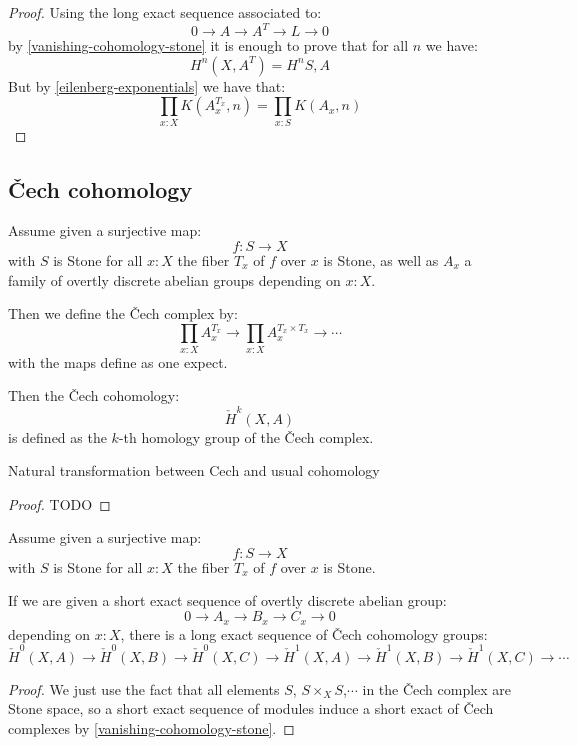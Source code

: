 \begin{proof}
Using the long exact sequence associated to:
\[0\to A\to A^T\to L\to 0\]
by \cref{vanishing-cohomology-stone} it is enough to prove that for all $n$ we have:
\[H^n(X,A^T) = H^n{S,A}\]
But by \cref{eilenberg-exponentials} we have that:
\[\prod_{x:X}K(A_x^{T_x},n) = \prod_{x:S}K(A_x,n)\]
\end{proof}


\subsection{\v{C}ech cohomology}

\begin{definition}
Assume given a surjective map:
\[f:S\to X\]
with $S$ is Stone for all $x:X$ the fiber $T_x$ of $f$ over $x$ is Stone, as well as $A_x$ a family of overtly discrete abelian groups depending on $x:X$.

Then we define the \v{C}ech complex by:
\[\prod_{x:X}A_x^{T_x} \to \prod_{x:X}A_x^{T_x\times T_x} \to \cdots\]
with the maps define as one expect.

Then the \v{C}ech cohomology:
\[\check{H}^k(X,A)\]
is defined as the $k$-th homology group of the \v{C}ech complex.
\end{definition}

\begin{lemma}
Natural transformation between Cech and usual cohomology
\end{lemma}

\begin{proof}
TODO
\end{proof}

\begin{lemma}
Assume given a surjective map:
\[f:S\to X\]
with $S$ is Stone for all $x:X$ the fiber $T_x$ of $f$ over $x$ is Stone.

If we are given a short exact sequence of overtly discrete abelian group:
\[0\to A_x\to B_x\to C_x\to 0\]
depending on $x:X$, there is a long exact sequence of \v{C}ech cohomology groups:
\[\check{H}^0(X,A) \to\check{H}^0(X,B) \to\check{H}^0(X,C) \to\check{H}^1(X,A) \to\check{H}^1(X,B) \to\check{H}^1(X,C) \to\cdots \]
\end{lemma}

\begin{proof}
We just use the fact that all elements $S$, $S\times_XS$,$\cdots$ in the \v{C}ech complex are Stone space, so a short exact sequence of modules induce a short exact of \v{C}ech complexes by \cref{vanishing-cohomology-stone}.
\end{proof}

